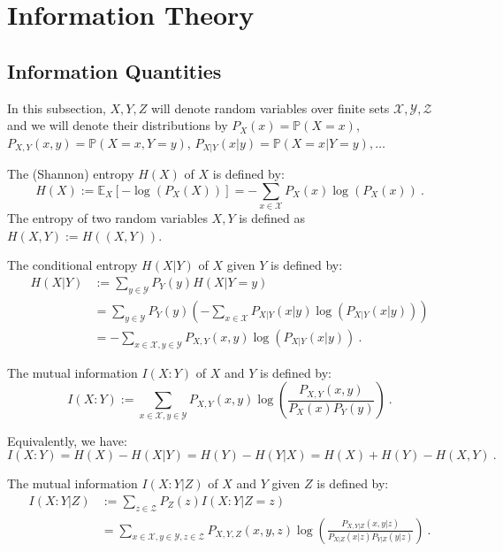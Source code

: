 \section{Information Theory}
\subsection{Information Quantities}
In this subsection, $X,Y,Z$ will denote random variables over finite sets $\mathcal{X},\mathcal{Y},\mathcal{Z}$ and we will denote their distributions by $P_X(x) = \mathbb{P}(X=x)$, $P_{X,Y}(x,y) = \mathbb{P}(X=x,Y=y)$, $P_{X|Y}(x|y) = \mathbb{P}(X=x|Y=y), \ldots$
\begin{definition}
   The (Shannon) entropy $H(X)$ of $X$ is defined by:
   \[ H(X) := \mathbb{E}_X[-\log(P_X(X))] = -\sum_{x \in \mathcal{X}}P_X(x)\log(P_X(x))\ . \]
   The entropy of two random variables $X,Y$ is defined as $H(X,Y) := H((X,Y))$.
\end{definition}

\begin{definition}
  The conditional entropy $H(X|Y)$ of $X$ given $Y$ is defined by:
   \begin{equation}
      \begin{aligned}
        H(X|Y) &:=  \sum_{y \in \mathcal{Y}}P_Y(y)H(X|Y=y)\\
        &=  \sum_{y \in \mathcal{Y}}P_Y(y)\left(-\sum_{x \in \mathcal{X}}P_{X|Y}(x|y)\log(P_{X|Y}(x|y)) \right)\\
        &= -\sum_{x \in \mathcal{X}, y \in \mathcal{Y}}P_{X,Y}(x,y)\log(P_{X|Y}(x|y)) \ .
        \end{aligned}
     \end{equation}
\end{definition}

\begin{definition}
  The mutual information $I(X:Y)$ of $X$ and $Y$ is defined by:
    \[ I(X:Y) := \sum_{x \in \mathcal{X}, y \in \mathcal{Y}}P_{X,Y}(x,y)\log\left(\frac{P_{X,Y}(x,y)}{P_X(x)P_Y(y)}\right)\ .\]
\end{definition}

\begin{proposition}
Equivalently, we have:
\[ I(X:Y) = H(X) - H(X|Y) = H(Y) - H(Y|X) = H(X) + H(Y) - H(X,Y) \ .\]
\end{proposition}

\begin{definition}
  The mutual information $I(X:Y|Z)$ of $X$ and $Y$ given $Z$ is defined by:
    \begin{equation}
       \begin{aligned}
          I(X:Y|Z) &:= \sum_{z \in \mathcal{Z}}P_Z(z)I(X : Y|Z=z)\\
          &= \sum_{x \in \mathcal{X}, y \in \mathcal{Y}, z \in \mathcal{Z}}P_{X,Y,Z}(x,y,z)\log\left(\frac{P_{X,Y|Z}(x,y|z)}{P_{X|Z}(x|z)P_{Y|Z}(y|z)}\right)\ .
       \end{aligned}
     \end{equation}   
\end{definition}

